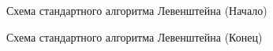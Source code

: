 \documentclass[a4paper,12pt]{article}
\begin{document}
\begin{figure}[h!]
\caption{Схема стандартного алгоритма Левенштейна (Начало)}
\label{images:levenstein}
\end{figure}

\begin{figure}[p]
\caption{Схема стандартного алгоритма Левенштейна (Конец)}
\label{images:levenstein2}
\end{figure}
\end{document}
